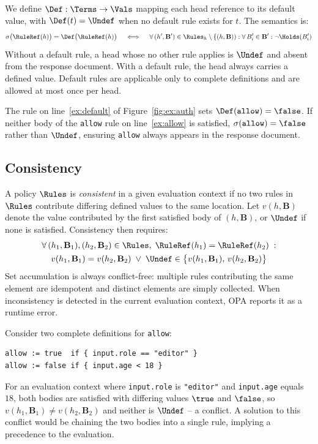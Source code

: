 We define $\Def : \Terms \to \Vals$ mapping each head reference to its default value,
with $\Def(t) = \Undef$ when no default rule exists for $t$.
The semantics is:
\[
\sigma\bigl(\RuleRef(h)\bigr) = \Def\bigl(\RuleRef(h)\bigr)
\quad \iff \quad
\forall\,(h', \mathbf{B}') \in \Rules_h \setminus \{(h,\mathbf{B})) :
\forall\, B'_i \in \mathbf{B}' : \neg\Holds(B'_i)
\]
Without a default rule, a head whose no other rule applies is $\Undef$ and absent from
the response document.
With a default rule, the head always carries a defined value.
Default rules are applicable only to complete definitions and are allowed at most once
per head.

\begin{example}
  The rule on line~\ref{ex:default} of Figure~\ref{fig:ex:auth} sets
  $\Def(\texttt{allow}) = \false$.
  If neither body of the \texttt{allow} rule on line~\ref{ex:allow} is satisfied,
  $\sigma(\texttt{allow}) = \false$ rather than $\Undef$, ensuring \texttt{allow}
  always appears in the response document.
\end{example}


\subsection{Consistency}
\label{ss:consistency}


A policy $\Rules$ is \emph{consistent} in a given evaluation context if no two rules
in $\Rules$ contribute differing defined values to the same location.
Let $v(h, \mathbf{B})$ denote the value contributed by the first satisfied body of
$(h, \mathbf{B})$, or $\Undef$ if none is satisfied.
Consistency then requires:
\begin{gather*}
  \forall\,(h_1,\mathbf{B}_1),(h_2,\mathbf{B}_2) \in \Rules,\;
  \RuleRef(h_1) = \RuleRef(h_2)\;: \\
  v(h_1,\mathbf{B}_1) = v(h_2,\mathbf{B}_2)
  \;\lor\;
  \Undef \in \bigl\{v(h_1,\mathbf{B}_1),\, v(h_2,\mathbf{B}_2)\bigr\}
\end{gather*}
Set accumulation is always conflict-free: multiple rules contributing the same element
are idempotent and distinct elements are simply collected.
When inconsistency is detected in the current evaluation context, OPA reports it as a
runtime error.

\begin{example}
  Consider two complete definitions for \texttt{allow}:
  \begin{lstlisting}[language=Rego]
allow := true  if { input.role == "editor" }
allow := false if { input.age < 18 }
\end{lstlisting}
  For an evaluation context where \texttt{input.role} is \texttt{"editor"} and \texttt{input.age} equals $18$, both bodies are satisfied with
  differing values $\true$ and $\false$, so $v(h_1, \mathbf{B}_1) \neq v(h_2, \mathbf{B}_2)$
  and neither is $\Undef$ -- a conflict.
  A solution to this conflict would be chaining the two bodies into a single rule, implying a precedence to the evaluation.
\end{example}
